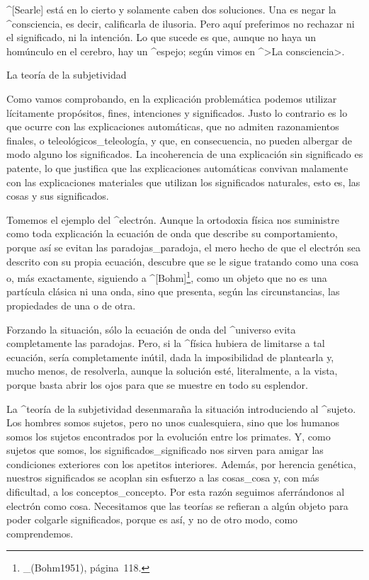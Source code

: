 ^[Searle] está en lo cierto y solamente caben dos soluciones. Una es
negar la ^{consciencia}, es decir, calificarla de ilusoria. Pero aquí
preferimos no rechazar ni el significado, ni la intención. Lo que sucede
es que, aunque no haya un homúnculo en el cerebro, hay un ^{espejo};
según vimos en ^>La consciencia>.


\Section La teoría de la subjetividad

Como vamos comprobando, en la explicación problemática podemos utilizar
lícitamente propósitos, fines, intenciones y significados. Justo lo
contrario es lo que ocurre con las explicaciones automáticas, que no
admiten razonamientos finales, o teleológicos_{teleología}, y que, en
consecuencia, no pueden albergar de modo alguno los significados. La
incoherencia de una explicación sin significado es patente, lo que
justifica que las explicaciones automáticas convivan malamente con las
explicaciones materiales que utilizan los significados naturales, esto
es, las cosas y sus significados.

Tomemos el ejemplo del ^{electrón}. Aunque la ortodoxia física nos
suministre como toda explicación la ecuación de onda que describe su
comportamiento, porque así se evitan las paradojas_{paradoja}, el mero
hecho de que el electrón sea descrito con su propia ecuación, descubre
que se le sigue tratando como una cosa o, más exactamente, siguiendo a
^[Bohm]\footnote{_(Bohm1951), página~118.}, como un objeto que no es una
partícula clásica ni una onda, sino que presenta, según las
circunstancias, las propiedades de una o de otra.

Forzando la situación, sólo la ecuación de onda del ^{universo} evita
completamente las paradojas. Pero, si la ^{física} hubiera de limitarse
a tal ecuación, sería completamente inútil, dada la imposibilidad de
plantearla y, mucho menos, de resolverla, aunque la solución esté,
literalmente, a la vista, porque basta abrir los ojos para que se
muestre en todo su esplendor.

La ^{teoría de la subjetividad} desenmaraña la situación introduciendo
al ^{sujeto}. Los hombres somos sujetos, pero no unos cualesquiera, sino
que los humanos somos los sujetos encontrados por la evolución entre los
primates. Y, como sujetos que somos, los significados_{significado} nos
sirven para amigar las condiciones exteriores con los apetitos
interiores. Además, por herencia genética, nuestros significados se
acoplan sin esfuerzo a las cosas_{cosa} y, con más dificultad, a los
conceptos_{concepto}. Por esta razón seguimos aferrándonos al electrón
como cosa. Necesitamos que las teorías se refieran a algún objeto para
poder colgarle significados, porque es así, y no de otro modo, como
comprendemos.

